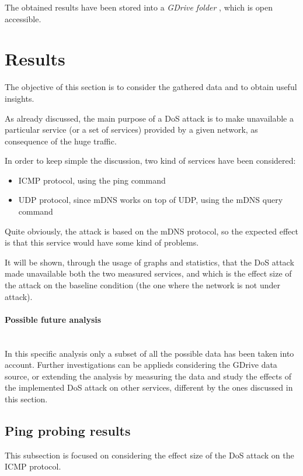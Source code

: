 \documentclass[fleqn, 11pt]{SelfArx} %
\begin{document}
The obtained results have been stored into a {\it{GDrive folder}} \cite{GDrive}, which is open accessible.

\section{Results}
The objective of this section is to consider the gathered data and to obtain useful insights.

As already discussed, the main purpose of a DoS attack is to make unavailable a particular service (or a set of services) provided by a given network, as consequence of the huge traffic.

In order to keep simple the discussion, two kind of services have been considered:
\begin{itemize}[leftmargin=*]
	\item ICMP protocol, using the ping command
 	\item UDP protocol, since mDNS works on top of UDP, using the mDNS query command
\end{itemize}

Quite obviously, the attack is based on the mDNS protocol, so the expected effect is that this service would have some kind of problems.

It will be shown, through the usage of graphs and statistics, that the DoS attack made unavailable both the two measured services, and which is the effect size of the attack on the baseline condition (the one where the network is not under attack).
\paragraph{Possible future analysis}\mbox{}\\
In this specific analysis only a subset of all the possible data has been taken into account.
Further investigations can be applieds considering the GDrive data source, or extending the analysis by measuring the data and study the effects of the implemented DoS attack on other services, different by the ones discussed in this section.

\subsection{Ping probing results}
This subsection is focused on considering the effect size of the DoS attack on the ICMP protocol.
\end{document}
